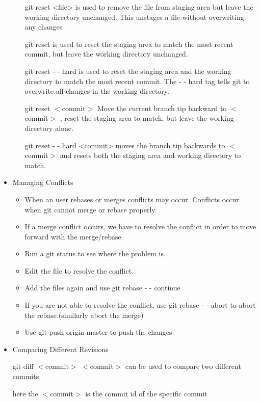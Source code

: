 \documentclass{article}
\begin{document}
\begin{itemize}
\begin{itemize}
\hspace{10mm} git reset <file> is used to remove the file from staging area but leave the working directory unchanged. This unstages a file without overwriting any changes

\hspace{10mm} git reset is used to reset the staging area to match the most recent commit, but leave the working directory unchanged.

\hspace{10mm} git reset - - hard is used to reset the staging area and the working directory to match the most recent commit.  The - - hard tag tells git to overwrite all changes in the working directory.

\hspace{10mm} git reset $<$commit$>$ Move the current branch tip backward to $<$commit$>$ , reset the staging area to match, but leave the working directory alone.

\hspace{10mm} git reset - - hard <commit> moves the branch tip backwards to $<$commit$>$ and resets both the staging area and working directory to match.


\end{itemize}


\item Managing Conflicts

\begin{itemize}
\item When an user rebases or merges conflicts may occur. Conflicts occur when git cannot merge or rebase properly.
\item If a merge conflict occurs, we have to resolve the conflict in order to move forward with the merge/rebase
\item Run a git status to see where the problem is.
\item Edit the file to resolve the conflict.
\item Add the files again and use git rebase - - continue
\item If you are not able to resolve the conflict, use git rebase - - abort to abort the rebase.(similarly abort the merge)
\item Use git push origin master to push the changes
\end{itemize}

\item Comparing Different Revisions

\hspace{10mm} git diff $<$commit$>$ $<$commit$>$ can be used to compare two different commits

\hspace{10mm} here the $<$commit$>$ is the commit id of the specific commit

\end{itemize}
\end{document}
